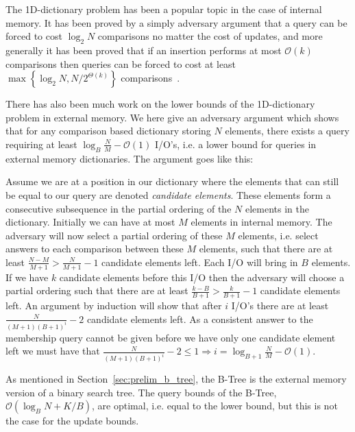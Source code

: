 \documentclass[twoside,11pt,openright]{report}
\begin{document}
The 1D-dictionary problem has been a popular topic in the case of internal memory. It has been proved by a simply adversary argument that a query can be forced to cost $\log_2 N$ comparisons no matter the cost of updates, and more generally it has been proved that if an insertion performs at most $\mathcal{O}(k)$ comparisons then queries can be forced to cost at least $\max\left\lbrace \log_2 N, N/2^{\Theta(k)}\right\rbrace$ comparisons~\cite{Borodin81efficientsearching}.

There has also been much work on the lower bounds of the 1D-dictionary problem in external memory. We here give an adversary argument which shows that for any comparison based dictionary storing $N$ elements, there exists a query requiring at least $\log_B \frac{N}{M} - \mathcal{O}(1)$ I/O's, i.e. a lower bound for queries in external memory dictionaries. The argument goes like this: 

Assume we are at a position in our dictionary where the elements that can still be equal to our query are denoted \textit{candidate elements}. These elements form a consecutive subsequence in the partial ordering of the $N$ elements in the dictionary.
Initially we can have at most $M$ elements in internal memory. The adversary will now select a partial ordering of these $M$ elements, i.e. select answers to each comparison between these $M$ elements, such that there are at least $\frac{N-M}{M+1} > \frac{N}{M+1}-1$ candidate elements left.
Each I/O will bring in $B$ elements. If we have $k$ candidate elements before this I/O then the adversary will choose a partial ordering such that there are at least $\frac{k-B}{B+1} > \frac{k}{B+1}-1$ candidate elements left.
An argument by induction will show that after $i$ I/O's there are at least $\frac{N}{(M+1)(B+1)^i} - 2$ candidate elements left. As a consistent answer to the membership query cannot be given before we have only one candidate element left we must have that $\frac{N}{(M+1)(B+1)^i} - 2 \leq 1 \Rightarrow i = \log_{B+1} \frac{N}{M} - \mathcal{O}(1)$.

As mentioned in Section~\ref{sec:prelim_b_tree}, the B-Tree is the external memory version of a binary search tree. The query bounds of the B-Tree, $\mathcal{O}(\log_B N + K/B)$, are optimal, i.e. equal to the lower bound, but this is not the case for the update bounds.

\clearpage
\end{document}
